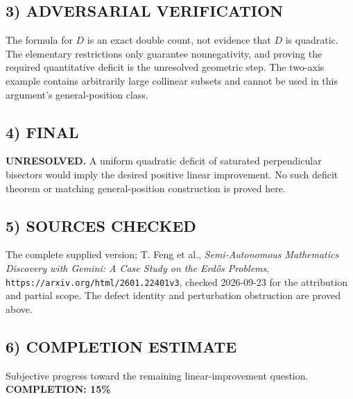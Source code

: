 \subsection*{3) ADVERSARIAL VERIFICATION}
The formula for $D$ is an exact double count, not evidence that $D$ is quadratic. The elementary restrictions only guarantee nonnegativity, and proving the required quantitative deficit is the unresolved geometric step. The two-axis example contains arbitrarily large collinear subsets and cannot be used in this argument's general-position class.
\subsection*{4) FINAL}
\textbf{UNRESOLVED.} A uniform quadratic deficit of saturated perpendicular bisectors would imply the desired positive linear improvement. No such deficit theorem or matching general-position construction is proved here.
\subsection*{5) SOURCES CHECKED}
The complete supplied version; T. Feng et al., \emph{Semi-Autonomous Mathematics Discovery with Gemini: A Case Study on the Erd\H{o}s Problems}, \texttt{https://arxiv.org/html/2601.22401v3}, checked 2026-09-23 for the attribution and partial scope. The defect identity and perturbation obstruction are proved above.
\subsection*{6) COMPLETION ESTIMATE}
Subjective progress toward the remaining linear-improvement question.
\textbf{COMPLETION: 15\%}
